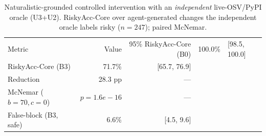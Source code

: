 \begin{table}[t]\centering
\caption{Naturalistic-grounded controlled intervention with an \emph{independent} live-OSV/PyPI oracle (U3+U2). RiskyAcc-Core over agent-generated changes the independent oracle labels risky ($n=247$); paired McNemar.}
\label{tab:e1a-indep}
\begin{tabular}{lrr}
\toprule
Metric & Value & 95\%%
\midrule
RiskyAcc-Core (B0) & 100.0\% & [98.5, 100.0] \\
RiskyAcc-Core (B3) & 71.7\% & [65.7, 76.9] \\
Reduction & 28.3 pp & --- \\
McNemar ($b{=}70,c{=}0$) & $p{=}1.6e-16$ & --- \\
False-block (B3, safe) & 6.6\% & [4.5, 9.6] \\
\bottomrule
\end{tabular}
\end{table}
